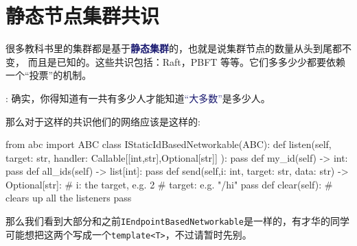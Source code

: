 \documentclass[dvipsnames]{ctexart}
\newcommand{\mycola}{MidnightBlue}
\newcommand{\mycolc}{OliveGreen}
\newcommand{\cola}[1]{\textcolor{\mycola}{#1}}
\newcommand{\colc}[1]{\textcolor{\mycolc}{#1}}
\newcommand{\Cola}[1]{\textcolor{\mycola}{\textbf{#1}}}
\begin{document}
\begin{comment}
      \node[text width=6cm,below] at ([shift={(0,-3cm)}]a0.south) {
        \begin{noteBox}
          4.如果确实\colc{接班人自己}也没有连上\cola{主节点}，则广播\textbf{view-change},并让大家了
          解下一任\colc{接班人}。
        \end{noteBox}
      };
    \end{scope}

  \end{tikzpicture}
\end{center}

\begin{myBox}{听一个共识-留一手版 （Follow-me Consensus）}
 见上图 
\end{myBox}

\emoji{parrot} : 那如果一个节点同时收到两个\cola{primary}的消息怎么办呢？
那么就和其他的共识算法一样（Raft，PBFT）， 节点只需要接受最新的命令就行了。
\end{comment}

\section{静态节点集群共识}

很多教科书里的集群都是基于\Cola{静态集群}的，也就是说集群节点的数量从头到尾都不变，
而且是已知的。这些共识包括：Raft，PBFT 等等。它们多多少少都要依赖一个``投票''的机制。

 : 确实，你得知道有一共有多少人才能知道\cola{“大多数”}是多少人。

\begin{center}
\end{center}

那么对于这样的共识他们的网络应该是这样的:
\begin{simplepy}
from abc import ABC
class IStaticIdBasedNetworkable(ABC):
    def listen(self,
               target: str,
               handler: Callable[[int,str],Optional[str]]
               ):
        pass
    def my_id(self) -> int:
        pass
    def all_ids(self) -> list[int]:
        pass
    def send(self,i: int, target: str, data: str) -> Optional[str]:
        # i: the target, e.g. 2
        # target: e.g. "/hi"
        pass
    def clear(self):                # clears up all the listeners
        pass
\end{simplepy}
那么我们看到大部分和之前\texttt{IEndpointBasedNetworkable}是一样的，有才华的同学
可能想把这两个写成一个\texttt{template<T>}，不过请暂时先别。
\end{document}
